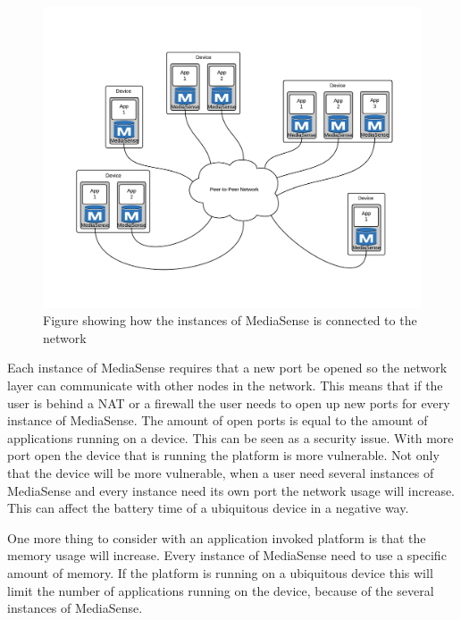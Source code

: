 \begin{figure}[t]
	\centering
    	\includegraphics[scale=0.25]{part_2/mediasense/several_nodes_on_one_device.png}
		\caption{Figure showing how the instances of MediaSense is connected to the network} 
\end{figure}

Each instance of MediaSense requires that a new port be opened so the network layer can communicate with other nodes in the network. This means that if the user is behind a NAT or a firewall the user needs to open up new ports for every instance of MediaSense. The amount of open ports is equal to the amount of applications running on a device. This can be seen as a security issue. With more port open the device that is running the platform is more vulnerable.
Not only that the device will be more vulnerable, when a user need several instances of MediaSense and every instance need its own port the network usage will increase. This can affect the battery time of a ubiquitous device in a negative way.

One more thing to consider with an application invoked platform is that the memory usage will increase. Every instance of MediaSense need to use a specific amount of memory. If the platform is running on a ubiquitous device this will limit the number of applications running on the device, because of the several instances of MediaSense.

